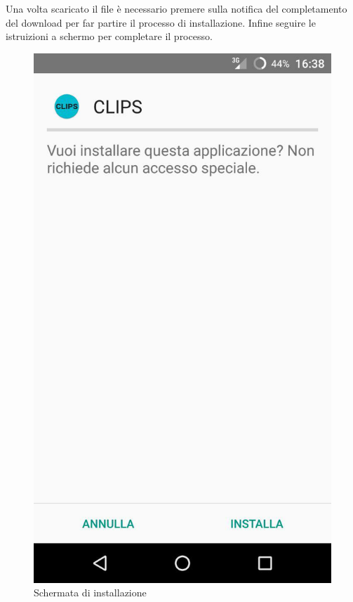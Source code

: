 Una volta scaricato il file è necessario premere sulla notifica del completamento del download per far partire il processo di installazione. Infine seguire le istruizioni a schermo per completare il processo.

\begin{figure}[!h]
	\centering
	\includegraphics[scale=0.15]{screenshot/installa}
	\caption{Schermata di installazione}
\end{figure}

